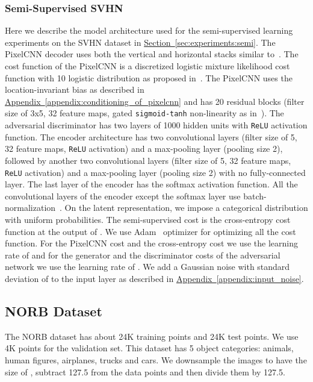 \documentclass{article}
\newcommand{\mysec}[1]{\hyperref[sec:#1]{Section~\ref*{sec:#1}}}
\newcommand{\myappendix}[1]{\hyperref[appendix:#1]{Appendix~\ref*{appendix:#1}}}
\begin{document}
\begin{appendices}
\subsubsection{Semi-Supervised SVHN}\label{appendix:semi-svhn}
Here we describe the model architecture used for the semi-supervised learning experiments on the SVHN dataset in \mysec{experiments:semi}.
The PixelCNN decoder uses both the vertical and horizontal stacks similar to~\citep{pixelcnn}. 
The cost function of the PixelCNN is a discretized logistic mixture likelihood cost function with 10 logistic distribution as proposed in~\citep{pixelcnn++}.
The PixelCNN uses the location-invariant bias as described in \myappendix{conditioning_of_pixelcnn} and has 20 residual blocks (filter size of 3x5, 32 feature maps, gated \texttt{sigmoid-tanh} non-linearity as in~\citep{pixelcnn}).
The adversarial discriminator has two layers of 1000 hidden units with \texttt{ReLU} activation function. 
The encoder architecture has two convolutional layers (filter size of 5, 32 feature maps, \texttt{ReLU} activation) and a max-pooling layer (pooling size 2), followed by another two convolutional layers (filter size of 5, 32 feature maps, \texttt{ReLU} activation) and a max-pooling layer (pooling size 2) with no fully-connected layer. The last layer of the encoder  has the softmax activation function. 
All the convolutional layers of the encoder except the softmax layer use batch-normalization~\citep{batch}. 
On the latent representation, we impose a categorical distribution with uniform probabilities. 
The semi-supervised cost is the cross-entropy cost function at the output of . We use Adam~\citep{Adam} optimizer for optimizing all the cost function. 
For the PixelCNN cost and the cross-entropy cost we use the learning rate of  and for the generator and the discriminator costs of the adversarial network we use the learning rate of .
We add a Gaussian noise with standard deviation of  to the input layer as described in \myappendix{input_noise}.

\subsection{NORB Dataset}\label{appendix:norb}
The NORB dataset has about 24K training points and 24K test points. We use 4K points for the validation set. This dataset has 5 object categories: animals, human figures, airplanes, trucks and cars. We downsample the images to have the size of , subtract 127.5 from the data points and then divide them by 127.5.


\end{appendices}
\end{document}
